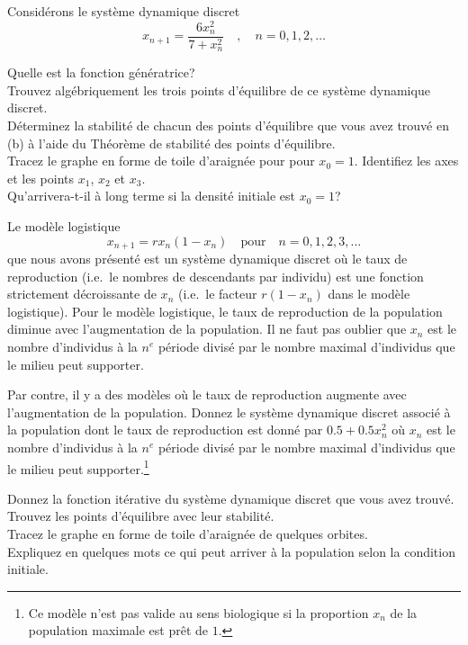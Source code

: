 \begin{question}[\life]
Considérons le système dynamique discret
\[
  x_{n+1} =  \frac{6 x_n^2}{7 + x_n^2} \quad , \quad n=0, 1, 2, \ldots
\]

 Quelle est la fonction génératrice?\\
 Trouvez algébriquement les trois points d'équilibre de ce
système dynamique discret.\\
 Déterminez la stabilité de chacun des points d'équilibre que
vous avez trouvé en (b) à l'aide du Théorème de stabilité des points
d'équilibre.\\
 Tracez le graphe en forme de toile d'araignée pour pour
$x_0 = 1$.  Identifiez les axes et les points $x_1$, $x_2$ et $x_3$.\\
 Qu'arrivera-t-il à long terme si la densité initiale est
$x_0=1$?
\label{6Q112}
\end{question}

\begin{question}[\life]
Le modèle logistique
\[
x_{n+1} = r x_n(1-x_n) \quad \text{pour} \quad n=0, 1, 2, 3, \ldots
\]
que nous avons présenté est un système dynamique discret où le taux de
reproduction (i.e.\ le nombres de descendants par individu) est une fonction
strictement décroissante de $x_n$ (i.e.\ le facteur $r(1-x_n)$ dans le
modèle logistique).  Pour le modèle logistique, le taux de
reproduction de la population diminue avec l'augmentation de la
population.  Il ne faut pas oublier que $x_n$ est le nombre
d'individus à la $n^e$ période divisé par le nombre maximal
d'individus que le milieu peut supporter.

Par contre, il y a des modèles où le taux de reproduction augmente avec
l'augmentation de la population.  Donnez le système dynamique discret associé
à la population dont le taux de reproduction est donné par $0.5+0.5x_n^2$ où
$x_n$ est le nombre d'individus à la $n^e$ période divisé par le nombre
maximal d'individus que le milieu peut supporter.\footnote{Ce modèle
n'est pas valide au sens biologique si la proportion $x_n$ de la
population maximale est prêt de $1$.}

 Donnez la fonction itérative du système dynamique discret que
vous avez trouvé.\\
 Trouvez les points d'équilibre avec leur stabilité.\\
 Tracez le graphe en forme de toile d'araignée de quelques
orbites.\\
 Expliquez en quelques mots ce qui peut arriver à la population
selon la condition initiale.
\label{6Q113}
\end{question}

